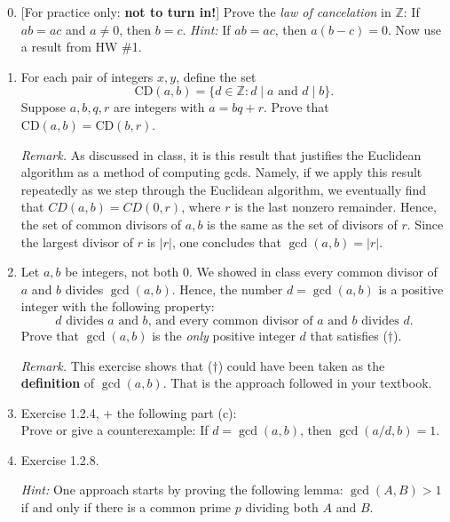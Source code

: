 \documentclass[11pt]{article}
\def\Z{\mathbb{Z}}
\theoremstyle{plain}
\theoremstyle{remark}
\begin{document}
\begin{enumerate}
\setcounter{enumi}{-1}

\item{[For practice only: \textbf{not to turn in!}]} Prove the \emph{law of cancelation} in $\Z$: If $ab=ac$ and $a\ne 0$, then $b=c$.
\emph{Hint:} If $ab=ac$, then $a(b-c)=0$. Now use a result from HW \#1.

\item For each pair of integers $x,y$, define the set
\[ \mathrm{CD}(a,b) = \{d \in \Z: d\mid a\text{ and } d\mid b\}. \]
Suppose $a,b, q, r$ are integers with $a=bq+r$. Prove that $\mathrm{CD}(a,b) = \mathrm{CD}(b,r)$.

{\scriptsize \emph{Remark.} As discussed in class, it is this result that justifies the Euclidean algorithm as a method of computing gcds. Namely, if we apply this result repeatedly as we step through the Euclidean algorithm, we eventually find that $CD(a,b) = CD(0,r)$, where $r$ is the last nonzero remainder. Hence, the set of common divisors of $a, b$ is the same as the set of divisors of $r$. Since the largest divisor of $r$ is $|r|$, one concludes that $\gcd(a,b)=|r|$.}

\item Let $a,b$ be integers, not both $0$. We showed in class every common divisor of $a$ and $b$ divides $\gcd(a,b)$. Hence, the number $d=\gcd(a,b)$ is a positive integer with the following property:
\begin{equation}
\tag{$\dagger$} \text{$d$ divides $a$ and $b$, and every common divisor of $a$ and $b$ divides $d$}.
\end{equation}
Prove that $\gcd(a,b)$ is the \emph{only} positive integer $d$ that satisfies ($\dagger$).

{\scriptsize \emph{Remark.} This exercise shows that ($\dagger$) could have been taken as the \textbf{definition} of $\gcd(a,b)$. That is the approach followed in your textbook.}

\item Exercise 1.2.4, + the following  part (c): \\Prove or give a counterexample: If $d=\gcd(a,b)$, then $\gcd(a/d,b)=1$.


\item Exercise 1.2.8.

{\scriptsize \emph{Hint: } One approach starts by proving the following lemma:  $\gcd(A,B) > 1$ if and only if there is a common prime $p$ dividing both $A$ and $B$.}



\end{enumerate}
\end{document}
